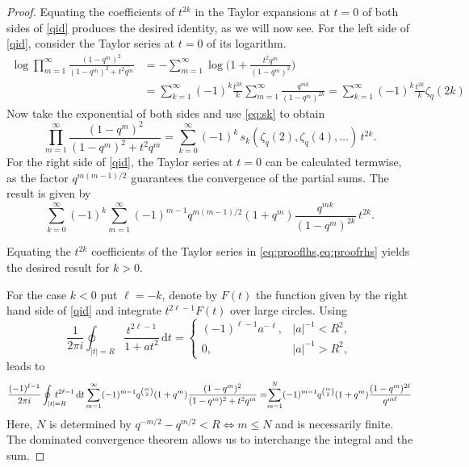 \documentclass[a4paper]{article}
\theoremstyle{plain}
\theoremstyle{definition}
\newcommand{\dd}{\mathrm{d}}
\renewcommand{\leq}{\leqslant}
\begin{document}
\begin{proof}
Equating the coefficients of $t^{2k}$ in the Taylor expansions at $t=0$ of both sides of \cref{qid} produces the desired identity, as we will now see. For the left side of \cref{qid}, consider the Taylor series at $t = 0$ of its logarithm.
\begin{align*}
\log\prod_{m=1}^\infty\frac{(1-q^m)^2}{(1-q^m)^2+t^2q^m} &= -\sum_{m=1}^\infty \log \bigg( 1+\frac{t^2q^m}{(1-q^m)^2} \bigg) \\
&= \sum_{k=1}^\infty (-1)^k\frac{t^{2k}}{k}\sum_{m=1}^\infty \frac{q^{mk}}{(1-q^m)^{2k}} =\sum_{k=1}^\infty (-1)^k\frac{t^{2k}}{k}\zeta_q(2k)
\end{align*}
Now take the exponential of both sides and use \cref{eq:sk} to obtain
\begin{equation} \label{eq:prooflhs}
\prod_{m=1}^\infty\frac{(1-q^m)^2}{(1-q^m)^2+t^2q^m}=\sum_{k=0}^\infty (-1)^k \, s_k(\zeta_q(2), \zeta_q(4), \ldots) \, t^{2k}.
\end{equation}
For the right side of \cref{qid}, the Taylor series at $t=0$ can be calculated termwise, as the factor $q^{m(m-1)/2}$ guarantees the convergence of the partial sums. The result is given by
\begin{equation} \label{eq:proofrhs}
\sum_{k=0}^\infty (-1)^k\sum_{m=1}^\infty (-1)^{m-1}q^{m(m-1)/2}(1+q^m)\frac{q^{mk}}{(1-q^m)^{2k}} \, t^{2k}.
\end{equation}


Equating the $t^{2k}$ coefficients of the Taylor series in \cref{eq:prooflhs,eq:proofrhs} yields the desired result for $k > 0$.


For the case $k < 0$ put $\ell=-k$, denote by $F(t)$ the function given by the right hand side of \cref{qid} and integrate $t^{2\ell-1} F(t)$ over large circles. Using
\begin{equation} \label{contint}
 \frac{1}{2\pi i}\oint_{|t|=R} \frac{t^{2\ell-1}}{1+at^2} \, \dd t = \begin{cases}
(-1)^{\ell -1}a^{-\ell }, &|a|^{-1}<R^2, \\
0, &|a|^{-1}>R^2,
\end{cases}
\end{equation} 
leads to
\begin{equation} \label{largecirc} 
 \frac{(-1)^{\ell -1}}{2\pi i}\oint_{|t|=R} \hspace{-5mm}t^{2\ell -1} \, \dd t \sum_{m=1}^\infty(-1)^{m-1}q^{\binom{m}{2}}(1+q^m)\frac{(1-q^m)^2}{(1-q^m)^2+t^2q^m} 
= \hspace{-1mm}\sum_{m=1}^N(-1)^{m-1}q^{\binom{m}{2}}(1+q^m)\frac{(1-q^m)^{2\ell }}{q^{m\ell }}
\end{equation}
Here, $N$ is determined by $q^{-m/2}-q^{m/2}<R \Leftrightarrow m \leq N$ and is necessarily finite. The dominated convergence theorem allows us to interchange the integral and the sum. 


\end{proof}
\end{document}
